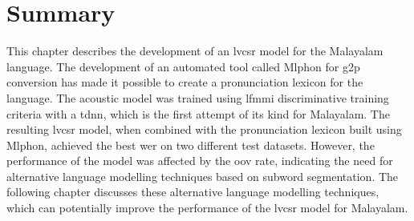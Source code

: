 \section{Summary}

This chapter describes the development of an \gls{lvcsr} model for the Malayalam language. The development of an automated tool called Mlphon for \gls{g2p} conversion has made it possible to create a pronunciation lexicon for the language. The acoustic model was trained using \gls{lfmmi} discriminative training criteria with a \gls{tdnn}, which is the first attempt of its kind for Malayalam. The resulting \gls{lvcsr} model, when combined with the pronunciation lexicon built using Mlphon, achieved the best \gls{wer} on two different test datasets. However, the performance of the model was affected by the \gls{oov} rate, indicating the need for alternative language modelling techniques based on subword segmentation. The following chapter discusses these alternative language modelling techniques, which can potentially improve the performance of the \gls{lvcsr} model for Malayalam.